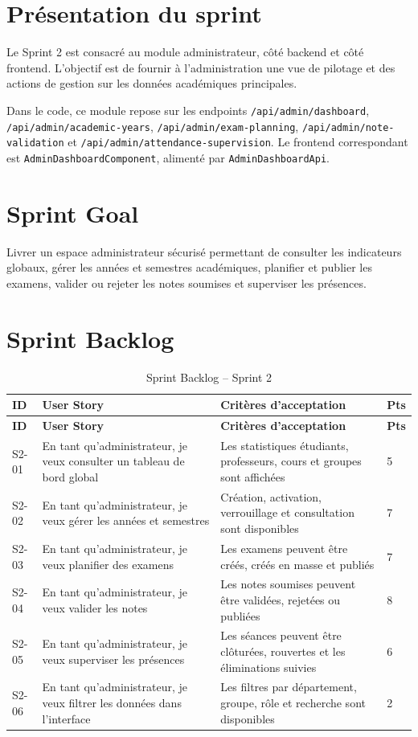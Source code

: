\documentclass[12pt,a4paper]{report}
\begin{document}
\section{Présentation du sprint}

Le Sprint 2 est consacré au module administrateur, côté backend et côté frontend. L'objectif est de fournir à l'administration une vue de pilotage et des actions de gestion sur les données académiques principales.

Dans le code, ce module repose sur les endpoints \texttt{/api/admin/dashboard}, \texttt{/api/admin/academic-years}, \texttt{/api/admin/exam-planning}, \texttt{/api/admin/note-validation} et \texttt{/api/admin/attendance-supervision}. Le frontend correspondant est \texttt{AdminDashboardComponent}, alimenté par \texttt{AdminDashboardApi}.

\section{Sprint Goal}

Livrer un espace administrateur sécurisé permettant de consulter les indicateurs globaux, gérer les années et semestres académiques, planifier et publier les examens, valider ou rejeter les notes soumises et superviser les présences.

\section{Sprint Backlog}

\begin{longtable}{|p{1.6cm}|p{6cm}|p{5.6cm}|p{1.4cm}|}
\caption{Sprint Backlog -- Sprint 2}\\
\hline
\textbf{ID} & \textbf{User Story} & \textbf{Critères d'acceptation} & \textbf{Pts} \\
\hline
\endfirsthead
\hline
\textbf{ID} & \textbf{User Story} & \textbf{Critères d'acceptation} & \textbf{Pts} \\
\hline
\endhead
S2-01 & En tant qu'administrateur, je veux consulter un tableau de bord global & Les statistiques étudiants, professeurs, cours et groupes sont affichées & 5 \\
\hline
S2-02 & En tant qu'administrateur, je veux gérer les années et semestres & Création, activation, verrouillage et consultation sont disponibles & 7 \\
\hline
S2-03 & En tant qu'administrateur, je veux planifier des examens & Les examens peuvent être créés, créés en masse et publiés & 7 \\
\hline
S2-04 & En tant qu'administrateur, je veux valider les notes & Les notes soumises peuvent être validées, rejetées ou publiées & 8 \\
\hline
S2-05 & En tant qu'administrateur, je veux superviser les présences & Les séances peuvent être clôturées, rouvertes et les éliminations suivies & 6 \\
\hline
S2-06 & En tant qu'administrateur, je veux filtrer les données dans l'interface & Les filtres par département, groupe, rôle et recherche sont disponibles & 2 \\
\hline
\end{longtable}
\end{document}
